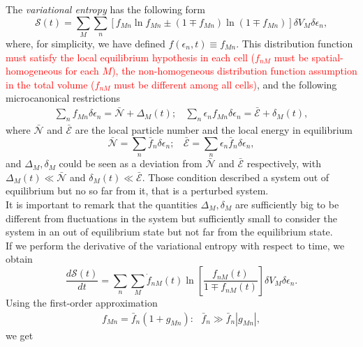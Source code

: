 \documentclass{article}
\newcommand{\de}{\delta}
\newcommand{\Ss}{\mathcal{S}}
\begin{document}
The \textit{variational entropy} has the following form
\begin{equation}
    \Ss(t)=\sum_{M} \sum_{n} \left[ f_{Mn} \ln f_{Mn} \pm (1 \mp f_{Mn}) \ln (1 \mp f_{Mn}) \right] \de V_M \delta \epsilon_n \label{entropy2},
\end{equation}
where, for simplicity, we have defined $f(\epsilon_{n},t)\equiv f_{Mn}$.
This distribution function \textcolor{red}{must satisfy the local equilibrium hypothesis in each cell ($f_{nM}$ must be spatial-homogeneous for each $M$), the non-homogeneous distribution function assumption in the total volume ($f_{nM}$ must be different among all cells)}, and the following microcanonical restrictions
\begin{eqnarray}
        \sum_{n}f_{Mn} \delta \epsilon_n=\bar{\mathcal{N}}+\Delta_M(t); \ \ \ \ \sum_{n}\epsilon_{n}f_{Mn} \delta \epsilon_n=\bar{\mathcal{E}}+ \delta_M(t), \label{restrictionoutside}
  \end{eqnarray}
  where $\bar {\mathcal{N}}$ and $\bar{\mathcal{E}}$ are the local particle number and the local energy in equilibrium
  \begin{equation}
      \bar{\mathcal{N}}= \sum_n \bar{f}_n \delta \epsilon_n; \ \ \ \ \bar{\mathcal{E}}= \sum_n \epsilon_n\bar{f}_n \delta \epsilon_n,
  \end{equation}
  and $\Delta_M,\delta_M$ could be seen as a deviation from $\bar{\mathcal{N}}$ and $\bar{\mathcal{E}}$ respectively, with $\Delta_M(t)\ll \bar{\mathcal{N}}$ and $\delta_M(t) \ll \bar{\mathcal{E}}$. Those condition described a system out of equilibrium but no so far from it, that is a perturbed system.\\
  It is important to remark that the quantities $\Delta_M,\delta_M$ are sufficiently big to be different from fluctuations in the system but sufficiently small to consider the system in an out of equilibrium state but not far from the equilibrium state.  \\
If we perform the derivative of the variational entropy with respect to time, we obtain
\begin{equation}
   \frac{d \Ss (t)}{dt}= \sum_n \sum_M \dot{f}_{nM}(t)\ln \left[ \frac{f_{nM}(t)}{1\mp f_{nM}(t)} \right] \de V_M \delta \epsilon_n.\label{deltaH}
\end{equation}{}
Using the first-order approximation
\begin{eqnarray}
   f_{Mn}=\bar{f}_{n}(1+g_{Mn}): \ \ \ \bar{f}_{n}\gg \bar{f}_{n}|g_{Mn}|, \label{firstorder}
\end{eqnarray}{}
we get 
\end{document}
